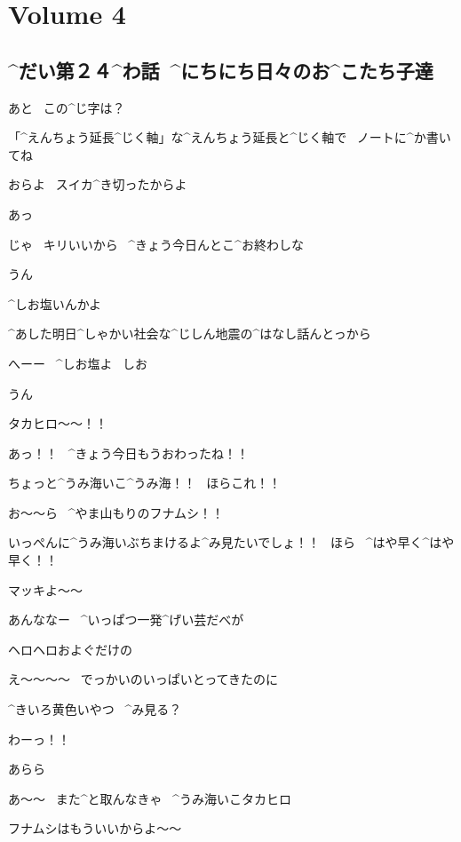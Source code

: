 \section{Volume 4}

\subsection{^{だい}{第}２４^{わ}{話}\ ^{にちにち}{日々}のお^{こたち}{子達}}

\page[4]
\Takahiro あと
\ この^{じ}{字}は？

\Person 「^{えんちょう}{延長}^{じく}{軸}」な^{えんちょう}{延長}と^{じく}{軸}で
\ ノートに^{か}{書}いてね

\Person おらよ
\ スイカ^{き}{切}ったからよ

\Takahiro あっ

\page
\Person じゃ
\ キリいいから
\ ^{きょう}{今日}んとこ^{お}{終}わしな

\Takahiro うん

\Person ^{しお}{塩}いんかよ

\Person ^{あした}{明日}^{しゃかい}{社会}な^{じしん}{地震}の^{はなし}{話}んとっから

\Person へーー
\ ^{しお}{塩}よ
\ しお

\Takahiro うん

\page
\Makki タカヒロ〜〜！！

\Makki あっ！！
\ ^{きょう}{今日}もうおわったね！！

\Makki ちょっと^{うみ}{海}いこ^{うみ}{海}！！
\ ほらこれ！！

\page
\Makki お〜〜ら
\ ^{やま}{山}もりのフナムシ！！

\Makki いっぺんに^{うみ}{海}いぶちまけるよ^{み}{見}たいでしょ！！
\ ほら
\ ^{はや}{早}く^{はや}{早}く！！

\Takahiro マッキよ〜〜

\Takahiro あんななー
\ ^{いっぱつ}{一発}^{げい}{芸}だべが

\Takahiro ヘロヘロおよぐだけの

\Makki え〜〜〜〜
\ でっかいのいっぱいとってきたのに

\Makki ^{きいろ}{黄色}いやつ
\ ^{み}{見}る？

\page
\Takahiro わーっ！！

\Makki あらら

\page
\Makki あ〜〜
\ また^{と}{取}んなきゃ
\ ^{うみ}{海}いこタカヒロ

\Takahiro フナムシはもういいからよ〜〜

